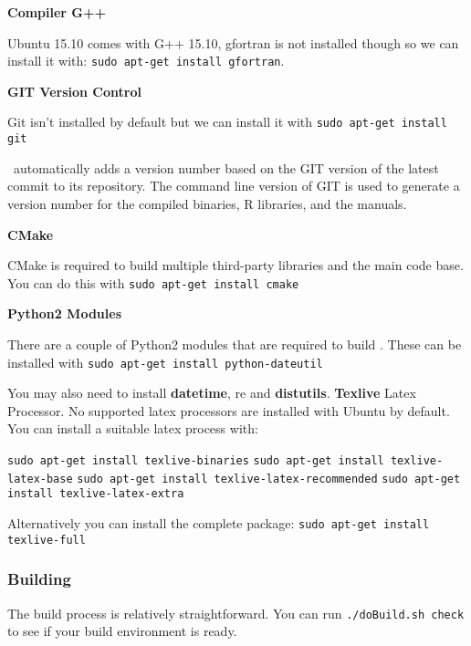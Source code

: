 \textbf{Compiler G++}

Ubuntu 15.10 comes with G++ 15.10, gfortran is not installed though so we can install it with: \texttt{sudo apt-get install gfortran}.

\textbf{GIT Version Control}

Git isn't installed by default but we can install it with \texttt{sudo apt-get install git}

\CNAME\ automatically adds a version number based on the GIT version of the latest commit to its repository. The command line version of GIT is used  to generate a version number for the compiled binaries, R libraries, and the manuals. 

\textbf{CMake}

CMake is required to build multiple third-party libraries and the main code base. You can do this with \texttt{sudo apt-get install cmake}

\textbf{Python2 Modules}

There are a couple of Python2 modules that are required to build \CNAME. These can be installed with \texttt{sudo apt-get install python-dateutil}

You may also need to install \textbf{datetime}, re and \textbf{distutils}. \textbf{Texlive} Latex Processor. No supported latex processors are installed with Ubuntu by default. You can install a suitable latex process with:

\texttt{sudo apt-get install texlive-binaries}
\texttt{sudo apt-get install texlive-latex-base}
\texttt{sudo apt-get install texlive-latex-recommended}
\texttt{sudo apt-get install texlive-latex-extra}

Alternatively you can install the complete package:
\texttt{sudo apt-get install texlive-full}

\subsubsection{Building \CNAME}

The build process is relatively straightforward. You can run \texttt{./doBuild.sh check} to see if your build environment is ready.

